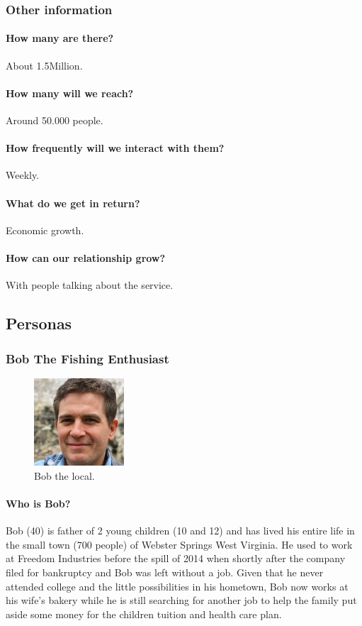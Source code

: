 \subsubsection{Other information}
\paragraph*{How many are there?} About 1.5Million.
\paragraph*{How many will we reach?} Around 50.000 people.
\paragraph*{How frequently will we interact with them?} Weekly.
\paragraph*{What do we get in return?} Economic growth.
\paragraph*{How can our relationship grow?} With people talking about the service.
\clearpage
\subsection{Personas}
\subsubsection{Bob The Fishing Enthusiast}
\begin{figure}
\vspace{-\baselineskip}
\centering
\includegraphics[width=0.3\textwidth]{Img/Bob}
\caption{Bob the local.}
\vspace{-2cm}
\end{figure} 
\paragraph*{Who is Bob?}
Bob (40) is father of 2 young children (10 and 12) and has lived his entire life in the small town (700 people) of Webster Springs West Virginia. He used to work at Freedom Industries before the spill of 2014 when shortly after the company filed for bankruptcy and Bob was left without a job. Given that he never attended college and the little possibilities in his hometown, Bob now works at his wife's bakery while he is still searching for another job to help the family put aside some money for the children tuition and health care plan.
